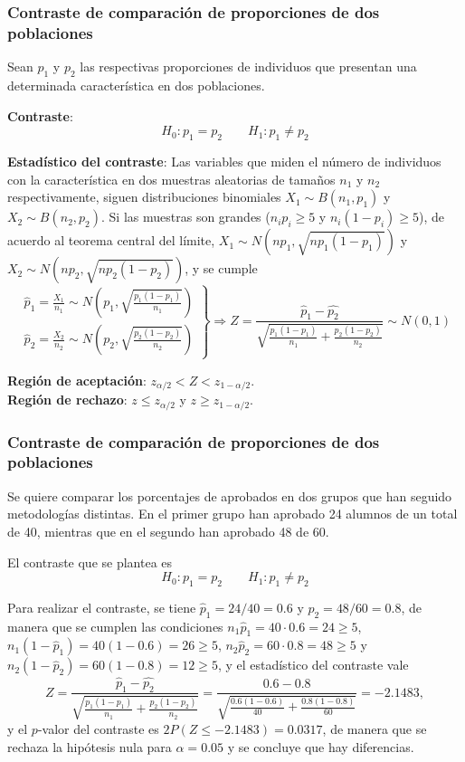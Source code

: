 \begin{frame}
\frametitle{Contraste de comparación de proporciones de dos poblaciones}
Sean $p_1$ y $p_2$ las respectivas proporciones de individuos que presentan una determinada característica en dos
poblaciones.

\textbf{Contraste}:
\[
H_0: p_1=p_2\qquad
H_1: p_1\neq p_2
\]

\textbf{Estadístico del contraste}: Las variables que miden el número de individuos con la característica en dos
muestras aleatorias de tamaños $n_1$ y $n_2$ respectivamente, siguen distribuciones binomiales $X_1\sim B(n_1,p_1)$
y $X_2\sim B(n_2,p_2)$. Si las muestras son grandes ($n_ip_i\geq 5$ y $n_i(1-p_i)\geq 5$), de acuerdo al teorema
central del límite, $X_1\sim N(np_1,\sqrt{np_1(1-p_1)})$ y $X_2\sim N(np_2,\sqrt{np_2(1-p_2)})$, y se cumple
{\footnotesize
\[
\left.
\begin{array}{l}
\hat{p}_1=\frac{X_1}{n_1} \sim N\left(p_1,\sqrt{\frac{p_1(1-p_1)}{n_1}}\right)\\
\hat{p}_2=\frac{X_2}{n_2} \sim N\left(p_2,\sqrt{\frac{p_2(1-p_2)}{n_2}}\right)
\end{array}
\right\}
\Rightarrow Z = \frac{\hat{p}_1-\hat{p_2}}{\sqrt{\frac{p_1(1-p_1)}{n_1}+\frac{p_2(1-p_2)}{n_2}}}\sim N(0,1)
\]
}

\textbf{Región de aceptación}: $z_{\alpha/2}< Z < z_{1-\alpha/2}$.\\
\textbf{Región de rechazo}: $z\leq z_{\alpha/2}$ y $z\geq z_{1-\alpha/2}$.
\end{frame}


\begin{frame}
\frametitle{Contraste de comparación de proporciones de dos poblaciones}
Se quiere comparar los porcentajes de aprobados en dos grupos que han seguido metodologías distintas. 
En el primer grupo han aprobado 24 alumnos de un total de 40, mientras que en el segundo han aprobado 48 de 60. 

El contraste que se plantea es 
\[
H_0: p_1=p_2\qquad
H_1: p_1\neq p_2
\]

Para realizar el contraste, se tiene $\hat{p}_1=24/40= 0.6$ y $\hat{p}_2=48/60=0.8$, de manera que se cumplen las
condiciones $n_1\hat{p}_1=40\cdot 0.6=24\geq 5$, $n_1(1-\hat{p}_1)=40(1-0.6)=26\geq 5$, $n_2\hat{p}_2=60\cdot 0.8
=48\geq 5$ y $n_2(1-\hat{p}_2)=60(1-0.8)=12\geq 5$, y el estadístico del contraste vale
\[
Z = \frac{\hat{p}_1-\hat{p_2}}{\sqrt{\frac{p_1(1-p_1)}{n_1}+\frac{p_2(1-p_2)}{n_2}}} =
\frac{0.6-0.8}{\sqrt{\frac{0.6(1-0.6)}{40}+\frac{0.8(1-0.8)}{60}}} = -2.1483,
\]
y el $p$-valor del contraste es $2P(Z\leq -2.1483)= 0.0317$, de manera que se rechaza la hipótesis nula para
$\alpha=0.05$ y se concluye que hay diferencias.
\end{frame}


